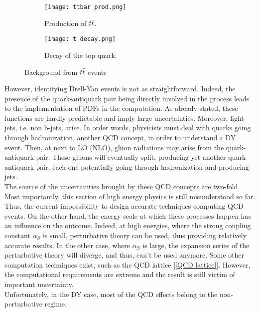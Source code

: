 \begin{figure}[H]
    \centering
    \begin{subfigure}{0.47\textwidth}
        \centering
        \texttt{[image: ttbar prod.png]}
        \caption{Production of $t \Bar{t}$.}
        \label{prod_tt}
    \end{subfigure}
    \hfill
    \begin{subfigure}{0.47\textwidth}
        \centering
        \texttt{[image: t decay.png]}
        \caption{Decay of the top quark.}
        \label{fig:plot2}
    \end{subfigure}
    \caption{Background from $t \Bar{t}$ events}
    \label{ttbar}
\end{figure}
However, identifying Drell-Yan events is not as straightforward. Indeed, the presence of the quark-antiquark pair being directly involved in the process leads to the implementation of PDFs in the computation. As already stated, these functions are hardly predictable and imply large uncertainties. Moreover, light jets, i.e. non b-jets, arise. In order words, physicists must deal with quarks going through hadronization, another QCD concept, in order to understand a DY event. Then, at next to LO (NLO), gluon radiations may arise from the quark-antiquark pair. These gluons will eventually split, producing yet another quark-antiquark pair, each one potentially going through hadronization and producing jets.\\
The source of the uncertainties brought by these QCD concepts are two-fold. Most importantly, this section of high energy physics is still misunderstood so far. Thus, the current impossibility to design accurate techniques computing QCD events. On the other hand, the energy scale at which these processes happen has an influence on the outcome. Indeed, at high energies, where the strong coupling constant $\alpha_S$ is small, perturbative theory can be used, thus providing relatively accurate results. In the other case, where $\alpha_S$ is large, the expansion series of the perturbative theory will diverge, and thus, can't be used anymore. Some other computation techniques exist, such as the QCD lattice [\ref{QCD lattice}]. However, the computational requirements are extreme and the result is still victim of important uncertainty.\\
Unfortunately, in the DY case, most of the QCD effects belong to the non-perturbative regime.






